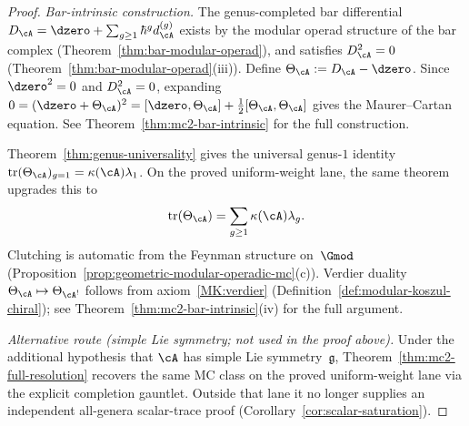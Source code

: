 \begin{proof}
\emph{Bar-intrinsic construction.}
The genus-completed bar differential
$D_\cA = \dzero + \sum_{g \geq 1} \hbar^g d_\cA^{(g)}$
exists by the modular operad structure of the bar complex
(Theorem~\ref{thm:bar-modular-operad}), and satisfies
$D_\cA^2 = 0$
(Theorem~\ref{thm:bar-modular-operad}(iii)).
Define $\Theta_\cA := D_\cA - \dzero$.  Since
$\dzero^2 = 0$ and $D_\cA^2 = 0$, expanding
$0 = (\dzero + \Theta_\cA)^2
= [\dzero, \Theta_\cA] + \tfrac12[\Theta_\cA,\Theta_\cA]$
gives the Maurer--Cartan equation.  See
Theorem~\ref{thm:mc2-bar-intrinsic} for the full construction.

Theorem~\ref{thm:genus-universality} gives the universal genus-$1$
identity
$\operatorname{tr}(\Theta_\cA)_{g=1}
= \kappa(\cA)\lambda_1$.
On the proved uniform-weight lane, the same theorem upgrades this to
\[
  \operatorname{tr}(\Theta_\cA)
  = \sum_{g \geq 1} \kappa(\cA)\lambda_g .
\]
Clutching is automatic from the Feynman structure on~$\Gmod$
(Proposition~\ref{prop:geometric-modular-operadic-mc}(c)).
Verdier duality $\Theta_\cA \mapsto \Theta_{\cA^!}$ follows
from axiom~\textup{\ref{MK:verdier}}
(Definition~\textup{\ref{def:modular-koszul-chiral}}); see
Theorem~\ref{thm:mc2-bar-intrinsic}(iv) for the full argument.

\emph{Alternative route (simple Lie symmetry; not used in the proof above).}
Under the additional hypothesis that $\cA$ has simple Lie
symmetry~$\mathfrak{g}$,
Theorem~\ref{thm:mc2-full-resolution} recovers the same MC class
on the proved uniform-weight lane via the explicit completion
gauntlet.  Outside that lane it no longer supplies an independent
all-genera scalar-trace proof
(Corollary~\ref{cor:scalar-saturation}).
\end{proof}

